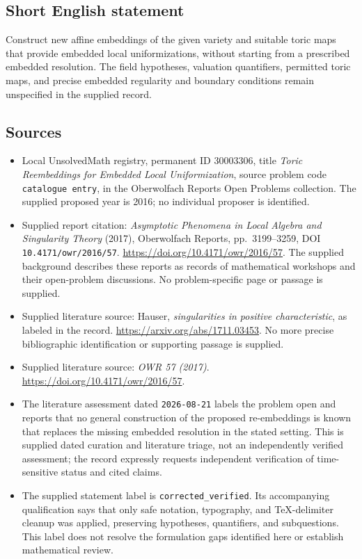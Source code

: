 \documentclass[11pt]{article}
\begin{document}
\subsection{Short English statement}
Construct new affine embeddings of the given variety and suitable toric maps that provide embedded local uniformizations, without starting from a prescribed embedded resolution. The field hypotheses, valuation quantifiers, permitted toric maps, and precise embedded regularity and boundary conditions remain unspecified in the supplied record.
\subsection{Sources}
\begin{itemize}
\item Local UnsolvedMath registry, permanent ID \(30003306\), title \emph{Toric Reembeddings for Embedded Local Uniformization}, source problem code \texttt{catalogue entry}, in the Oberwolfach Reports Open Problems collection. The supplied proposed year is 2016; no individual proposer is identified.
\item Supplied report citation: \emph{Asymptotic Phenomena in Local Algebra and Singularity Theory} (2017), Oberwolfach Reports, pp.~3199--3259, DOI \texttt{10.4171/owr/2016/57}. \url{https://doi.org/10.4171/owr/2016/57}. The supplied background describes these reports as records of mathematical workshops and their open-problem discussions. No problem-specific page or passage is supplied.
\item Supplied literature source: Hauser, \emph{singularities in positive characteristic}, as labeled in the record. \url{https://arxiv.org/abs/1711.03453}. No more precise bibliographic identification or supporting passage is supplied.
\item Supplied literature source: \emph{OWR 57 (2017)}. \url{https://doi.org/10.4171/owr/2016/57}.
\item The literature assessment dated \texttt{2026-08-21} labels the problem open and reports that no general construction of the proposed re-embeddings is known that replaces the missing embedded resolution in the stated setting. This is supplied dated curation and literature triage, not an independently verified assessment; the record expressly requests independent verification of time-sensitive status and cited claims.
\item The supplied statement label is \texttt{corrected\_verified}. Its accompanying qualification says that only safe notation, typography, and TeX-delimiter cleanup was applied, preserving hypotheses, quantifiers, and subquestions. This label does not resolve the formulation gaps identified here or establish mathematical review.
\end{itemize}
\end{document}
